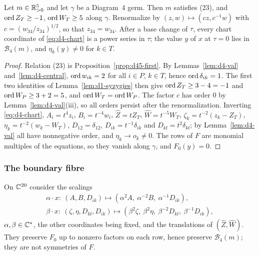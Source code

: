 \begin{proposition}[Coverage]\label{prop:d4-cover}
Let $m\in\mathbb{R}_{>0}^5$ and let $\gamma$ be a Diagram~4 germ.  Then $m$ satisfies (23), and
$\operatorname{ord} Z_T\ge-1$, $\operatorname{ord} W_T\ge5$ along $\gamma$.  Renormalize by $(z,w)\mapsto(cz,c^{-1}w)$ with
$c=(w_{34}/z_{34})^{1/2}$, so that $z_{34}=w_{34}$.  After a base change of $\tau$, every chart
coordinate of \eqref{eq:d4-chart} is a power series in $\tau$; the value $y$ of $x$ at $\tau=0$
lies in $\mathcal B_4(m)$, and $\eta_k(y)\ne0$ for $k\in T$.
\end{proposition}

\begin{proof}
Relation (23) is Proposition~\ref{prop:d45-first}.  By Lemmas~\ref{lem:d4-val}
and~\ref{lem:d4-central}, $\operatorname{ord} w_{ik}=2$ for all $i\in P$, $k\in T$, hence $\operatorname{ord}\delta_{ik}=1$.
The first two identities of Lemma~\ref{lem:d1-syzygies} then give $\operatorname{ord} Z_T\ge3-4=-1$ and
$\operatorname{ord} W_P\ge3+2=5$, and $\operatorname{ord} W_T=\operatorname{ord} W_P$.  The factor $c$ has order $0$ by
Lemma~\ref{lem:d4-val}(iii), so all orders persist after the renormalization.  Inverting
\eqref{eq:d4-chart}, $A_i=t^4z_i$, $B_i=t^{-4}w_i$, $\hat Z=tZ_T$, $\hat W=t^{-5}W_T$,
$\zeta_k=t^{-2}(z_k-Z_T)$, $\eta_k=t^{-2}(w_k-W_T)$, $D_{12}=\delta_{12}$, $D_{ik}=t^{-1}\delta_{ik}$
and $D_{kl}=t^2\delta_{kl}$; by Lemma~\ref{lem:d4-val} all have nonnegative order, and
$\eta_k\to o_k\ne0$.  The rows of $F$ are monomial multiples of the equations, so they vanish
along $\gamma$, and $F_0(y)=0$.
\end{proof}

\subsubsection{The boundary fibre}\label{d4-fibre}
On $\mathbb{C}^{20}$ consider the scalings
\[
\begin{gathered}
  \alpha\cdot x:\ (A,B,D_{ik})\mapsto(\alpha^2A,\ \alpha^{-2}B,\ \alpha^{-1}D_{ik}),\\
  \beta\cdot x:\ (\zeta,\eta,D_{kl},D_{ik})\mapsto(\beta^2\zeta,\ \beta^2\eta,\ \beta^{-2}D_{kl},\
  \beta^{-1}D_{ik}),
\end{gathered}
\]
$\alpha,\beta\in\mathbb{C}^*$, the other coordinates being fixed, and the translations of $(\hat Z,\hat W)$.
They preserve $F_0$ up to nonzero factors on each row, hence preserve $\mathcal B_4(m)$; they
are not symmetries of $F$.


